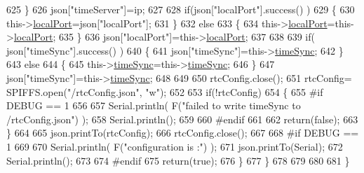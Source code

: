 \begin{DoxyCode}
625             \}
626             json[\textcolor{stringliteral}{"timeServer"}]=ip;
627             
628             \textcolor{keywordflow}{if}(json[\textcolor{stringliteral}{"localPort"}].success() )
629             \{                       
630                 this->\hyperlink{classCoolTime_a2f777da44d7ba678be8185299e9b49d1}{localPort}=json[\textcolor{stringliteral}{"localPort"}];
631             \}
632             \textcolor{keywordflow}{else}
633             \{
634                 this->\hyperlink{classCoolTime_a2f777da44d7ba678be8185299e9b49d1}{localPort}=this->\hyperlink{classCoolTime_a2f777da44d7ba678be8185299e9b49d1}{localPort};
635             \}
636             json[\textcolor{stringliteral}{"localPort"}]=this->\hyperlink{classCoolTime_a2f777da44d7ba678be8185299e9b49d1}{localPort};
637 
638 
639             \textcolor{keywordflow}{if}( json[\textcolor{stringliteral}{"timeSync"}].success() )
640             \{
641                 json[\textcolor{stringliteral}{"timeSync"}]=this->\hyperlink{classCoolTime_a9d032e76c3470a15b3bbbc52af6463f7}{timeSync};
642             \}
643             \textcolor{keywordflow}{else}
644             \{
645                 this->\hyperlink{classCoolTime_a9d032e76c3470a15b3bbbc52af6463f7}{timeSync}=this->\hyperlink{classCoolTime_a9d032e76c3470a15b3bbbc52af6463f7}{timeSync};
646             \}
647             json[\textcolor{stringliteral}{"timeSync"}]=this->\hyperlink{classCoolTime_a9d032e76c3470a15b3bbbc52af6463f7}{timeSync};
648 
649 
650             rtcConfig.close();
651             rtcConfig= SPIFFS.open(\textcolor{stringliteral}{"/rtcConfig.json"}, \textcolor{stringliteral}{"w"});
652             
653             \textcolor{keywordflow}{if}(!rtcConfig)
654             \{
655 \textcolor{preprocessor}{            #if DEBUG == 1}
656 
657                 Serial.println( F(\textcolor{stringliteral}{"failed to write timeSync to /rtcConfig.json"}) );
658                 Serial.println();
659             
660 \textcolor{preprocessor}{            #endif}
661 
662                 \textcolor{keywordflow}{return}(\textcolor{keyword}{false});
663             \}
664             
665             json.printTo(rtcConfig);
666             rtcConfig.close();
667     
668 \textcolor{preprocessor}{        #if DEBUG == 1}
669 
670             Serial.println( F(\textcolor{stringliteral}{"configuration is :"}) );
671             json.printTo(Serial);
672             Serial.println();
673         
674 \textcolor{preprocessor}{        #endif}
675             \textcolor{keywordflow}{return}(\textcolor{keyword}{true}); 
676         \}
677     \}   
678 
679 
680 
681 \}
\end{DoxyCode}
